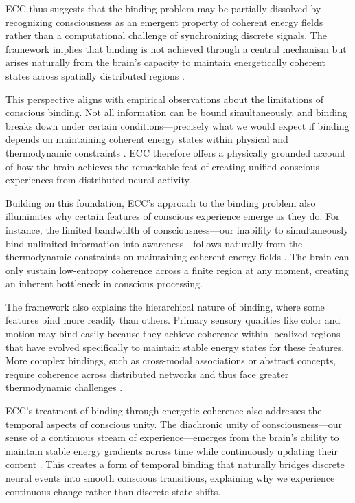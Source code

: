 \begin{refsection}
ECC thus suggests that the binding problem may be partially dissolved by recognizing consciousness as an emergent property of coherent energy fields rather than a computational challenge of synchronizing discrete signals. The framework implies that binding is not achieved through a central mechanism but arises naturally from the brain's capacity to maintain energetically coherent states across spatially distributed regions \cite{lisman2013theta}.

This perspective aligns with empirical observations about the limitations of conscious binding. Not all information can be bound simultaneously, and binding breaks down under certain conditions—precisely what we would expect if binding depends on maintaining coherent energy states within physical and thermodynamic constraints \cite{zeki1999toward}. ECC therefore offers a physically grounded account of how the brain achieves the remarkable feat of creating unified conscious experiences from distributed neural activity.

Building on this foundation, ECC's approach to the binding problem also illuminates why certain features of conscious experience emerge as they do. For instance, the limited bandwidth of consciousness—our inability to simultaneously bind unlimited information into awareness—follows naturally from the thermodynamic constraints on maintaining coherent energy fields \cite{gray1999temporal}. The brain can only sustain low-entropy coherence across a finite region at any moment, creating an inherent bottleneck in conscious processing.

The framework also explains the hierarchical nature of binding, where some features bind more readily than others. Primary sensory qualities like color and motion may bind easily because they achieve coherence within localized regions that have evolved specifically to maintain stable energy states for these features. More complex bindings, such as cross-modal associations or abstract concepts, require coherence across distributed networks and thus face greater thermodynamic challenges \cite{engel2001temporal}.

ECC's treatment of binding through energetic coherence also addresses the temporal aspects of conscious unity. The diachronic unity of consciousness—our sense of a continuous stream of experience—emerges from the brain's ability to maintain stable energy gradients across time while continuously updating their content \cite{fell2011role}. This creates a form of temporal binding that naturally bridges discrete neural events into smooth conscious transitions, explaining why we experience continuous change rather than discrete state shifts.


\end{refsection}
